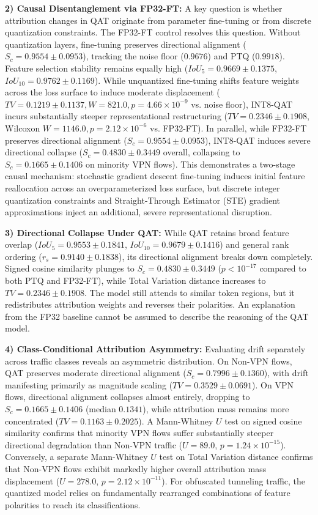 \documentclass[conference]{IEEEtran}
\begin{document}
\textbf{2) Causal Disentanglement via FP32-FT:} A key question is whether attribution changes in QAT originate from parameter fine-tuning or from discrete quantization constraints. The FP32-FT control resolves this question. Without quantization layers, fine-tuning preserves directional alignment ($S_c = 0.9554 \pm 0.0953$), tracking the noise floor ($0.9676$) and PTQ ($0.9918$). Feature selection stability remains equally high ($IoU_5 = 0.9669 \pm 0.1375$, $IoU_{10} = 0.9762 \pm 0.1169$). While unquantized fine-tuning shifts feature weights across the loss surface to induce moderate displacement ($TV = 0.1219 \pm 0.1137, W = 821.0, p = 4.66 \times 10^{-9}$ vs. noise floor), INT8-QAT incurs substantially steeper representational restructuring ($TV = 0.2346 \pm 0.1908$, Wilcoxon $W = 1146.0, p = 2.12 \times 10^{-6}$ vs. FP32-FT). In parallel, while FP32-FT preserves directional alignment ($S_c = 0.9554 \pm 0.0953$), INT8-QAT induces severe directional collapse ($S_c = 0.4830 \pm 0.3449$ overall, collapsing to $S_c = 0.1665 \pm 0.1406$ on minority VPN flows). This demonstrates a two-stage causal mechanism: stochastic gradient descent fine-tuning induces initial feature reallocation across an overparameterized loss surface, but discrete integer quantization constraints and Straight-Through Estimator (STE) gradient approximations inject an additional, severe representational disruption.

\textbf{3) Directional Collapse Under QAT:} While QAT retains broad feature overlap ($IoU_5 = 0.9553 \pm 0.1841$, $IoU_{10} = 0.9679 \pm 0.1416$) and general rank ordering ($r_s = 0.9140 \pm 0.1838$), its directional alignment breaks down completely. Signed cosine similarity plunges to $S_c = 0.4830 \pm 0.3449$ ($p < 10^{-17}$ compared to both PTQ and FP32-FT), while Total Variation distance increases to $TV = 0.2346 \pm 0.1908$. The model still attends to similar token regions, but it redistributes attribution weights and reverses their polarities. An explanation from the FP32 baseline cannot be assumed to describe the reasoning of the QAT model.

\textbf{4) Class-Conditional Attribution Asymmetry:} Evaluating drift separately across traffic classes reveals an asymmetric distribution. On Non-VPN flows, QAT preserves moderate directional alignment ($S_c = 0.7996 \pm 0.1360$), with drift manifesting primarily as magnitude scaling ($TV = 0.3529 \pm 0.0691$). On VPN flows, directional alignment collapses almost entirely, dropping to $S_c = 0.1665 \pm 0.1406$ (median $0.1341$), while attribution mass remains more concentrated ($TV = 0.1163 \pm 0.2025$). A Mann-Whitney $U$ test on signed cosine similarity confirms that minority VPN flows suffer substantially steeper directional degradation than Non-VPN traffic ($U = 89.0$, $p = 1.24 \times 10^{-15}$). Conversely, a separate Mann-Whitney $U$ test on Total Variation distance confirms that Non-VPN flows exhibit markedly higher overall attribution mass displacement ($U = 278.0$, $p = 2.12 \times 10^{-11}$). For obfuscated tunneling traffic, the quantized model relies on fundamentally rearranged combinations of feature polarities to reach its classifications.
\end{document}
